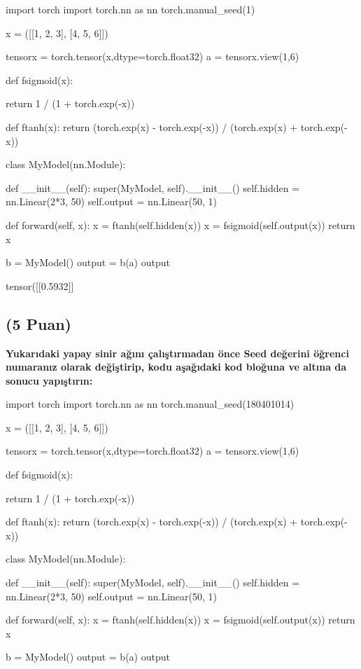\documentclass[11pt]{article}
\begin{document}
\begin{python}
import torch
import torch.nn as nn
torch.manual_seed(1)

x = ([[1, 2, 3], [4, 5, 6]])

tensorx = torch.tensor(x,dtype=torch.float32)
a = tensorx.view(1,6)

def fsigmoid(x):

  return 1 / (1 + torch.exp(-x))

def ftanh(x):
  return (torch.exp(x) - torch.exp(-x)) / (torch.exp(x) + torch.exp(-x))

class MyModel(nn.Module):  

    def __init__(self):
        super(MyModel, self).__init__()
        self.hidden = nn.Linear(2*3, 50)
        self.output = nn.Linear(50, 1)

    def forward(self, x):
        x = ftanh(self.hidden(x))
        x = fsigmoid(self.output(x))
        return x

b = MyModel()
output = b(a)
output

\end{python}

tensor([[0.5932]]

\subsection{(5 Puan)} \textbf{Yukarıdaki yapay sinir ağını çalıştırmadan önce Seed değerini öğrenci numaranız olarak değiştirip, kodu aşağıdaki kod bloğuna ve altına da sonucu yapıştırın:}

\begin{python}
import torch
import torch.nn as nn
torch.manual_seed(180401014)

x = ([[1, 2, 3], [4, 5, 6]])

tensorx = torch.tensor(x,dtype=torch.float32)
a = tensorx.view(1,6)

def fsigmoid(x):

  return 1 / (1 + torch.exp(-x))

def ftanh(x):
  return (torch.exp(x) - torch.exp(-x)) / (torch.exp(x) + torch.exp(-x))

class MyModel(nn.Module):  

    def __init__(self):
        super(MyModel, self).__init__()
        self.hidden = nn.Linear(2*3, 50)
        self.output = nn.Linear(50, 1)

    def forward(self, x):
        x = ftanh(self.hidden(x))
        x = fsigmoid(self.output(x))
        return x

b = MyModel()
output = b(a)
output
\end{python}
\end{document}
